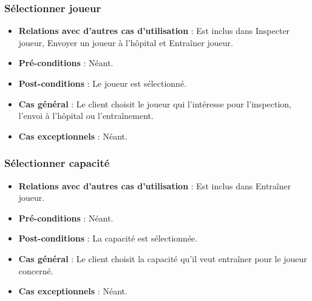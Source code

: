 \documentclass[a4paper,titlepage]{scrreprt}
\begin{document}
    \subsubsection{Sélectionner joueur}
      \begin{itemize}
        \item \textbf{Relations avec d'autres cas d'utilisation}  : Est inclus dans Inspecter joueur, Envoyer un joueur à l'hôpital et Entraîner joueur.
        \item \textbf{Pré-conditions} : Néant.
        \item \textbf{Post-conditions} : Le joueur est sélectionné.
        \item \textbf{Cas général} : Le client choisit le joueur qui l'intéresse pour l'inspection, l'envoi à l'hôpital ou l'entraînement.
        \item \textbf{Cas exceptionnels} : Néant.
      \end{itemize}

    \subsubsection{Sélectionner capacité}
      \begin{itemize}
        \item \textbf{Relations avec d'autres cas d'utilisation}  : Est inclus dans Entraîner joueur.
        \item \textbf{Pré-conditions} : Néant.
        \item \textbf{Post-conditions} : La capacité est sélectionnée.
        \item \textbf{Cas général} : Le client choisit la capacité qu'il veut entraîner pour le joueur concerné.
        \item \textbf{Cas exceptionnels} : Néant.
      \end{itemize}
\end{document}
